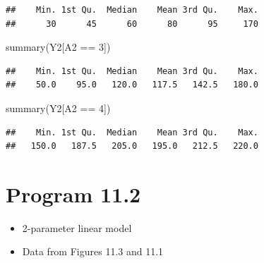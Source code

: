 \documentclass[
  10pt,
]{book}
\newenvironment{Shaded}{\begin{snugshade}}{\end{snugshade}}
\newcommand{\DecValTok}[1]{\textcolor[rgb]{0.00,0.00,0.81}{#1}}
\newcommand{\FunctionTok}[1]{\textcolor[rgb]{0.00,0.00,0.00}{#1}}
\newcommand{\NormalTok}[1]{#1}
\newcommand{\SpecialCharTok}[1]{\textcolor[rgb]{0.00,0.00,0.00}{#1}}
\providecommand{\tightlist}{%
  \setlength{\itemsep}{0pt}\setlength{\parskip}{0pt}}
\begin{document}
\begin{verbatim}
##    Min. 1st Qu.  Median    Mean 3rd Qu.    Max. 
##      30      45      60      80      95     170
\end{verbatim}

\begin{Shaded}
\begin{Highlighting}[]
\FunctionTok{summary}\NormalTok{(Y2[A2 }\SpecialCharTok{==} \DecValTok{3}\NormalTok{])}
\end{Highlighting}
\end{Shaded}

\begin{verbatim}
##    Min. 1st Qu.  Median    Mean 3rd Qu.    Max. 
##    50.0    95.0   120.0   117.5   142.5   180.0
\end{verbatim}

\begin{Shaded}
\begin{Highlighting}[]
\FunctionTok{summary}\NormalTok{(Y2[A2 }\SpecialCharTok{==} \DecValTok{4}\NormalTok{])}
\end{Highlighting}
\end{Shaded}

\begin{verbatim}
##    Min. 1st Qu.  Median    Mean 3rd Qu.    Max. 
##   150.0   187.5   205.0   195.0   212.5   220.0
\end{verbatim}

\hypertarget{program-11.2}{%
\section{Program 11.2}\label{program-11.2}}

\begin{itemize}
\tightlist
\item
  2-parameter linear model
\item
  Data from Figures 11.3 and 11.1
\end{itemize}
\end{document}

